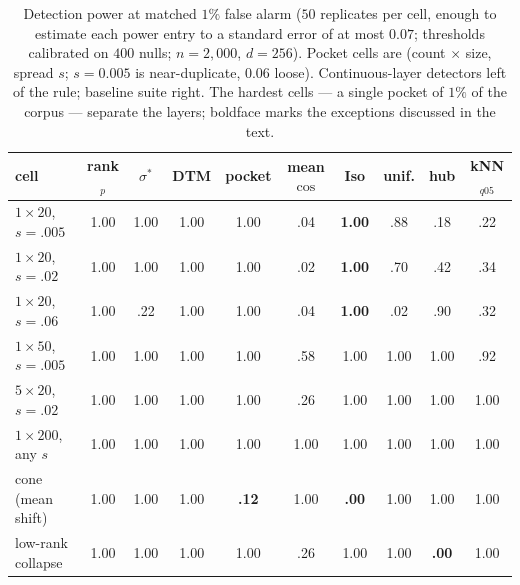 \documentclass[11pt,letterpaper]{article}
\newcommand{\sstar}{\sigma^{*}}
\begin{document}
\begin{table}[t]
\centering
\caption{Detection power at matched $1\%$ false alarm ($50$ replicates per cell,
enough to estimate each power entry to a standard error of at most $0.07$;
thresholds calibrated on $400$ nulls; $n = 2{,}000$, $d = 256$). Pocket
cells are (count $\times$ size, spread $s$; $s = 0.005$ is near-duplicate,
$0.06$ loose). Continuous-layer detectors left of the rule; baseline suite
right. The hardest cells --- a single pocket of $1\%$ of the corpus ---
separate the layers; boldface marks the exceptions discussed in the text.}
\label{tab:power}
\small
\setlength{\tabcolsep}{4.2pt}
\begin{tabular}{l cccc | ccccc}
\toprule
cell & rank$_p$ & $\sstar$ & DTM & pocket & mean$\cos$ & Iso & unif. & hub & kNN$_{q05}$\\
\midrule
$1{\times}20$, $s{=}.005$ & 1.00 & 1.00 & 1.00 & 1.00 & .04 & \textbf{1.00} & .88 & .18 & .22\\
$1{\times}20$, $s{=}.02$  & 1.00 & 1.00 & 1.00 & 1.00 & .02 & \textbf{1.00} & .70 & .42 & .34\\
$1{\times}20$, $s{=}.06$  & 1.00 & .22 & 1.00 & 1.00 & .04 & \textbf{1.00} & .02 & .90 & .32\\
$1{\times}50$, $s{=}.005$ & 1.00 & 1.00 & 1.00 & 1.00 & .58 & 1.00 & 1.00 & 1.00 & .92\\
$5{\times}20$, $s{=}.02$  & 1.00 & 1.00 & 1.00 & 1.00 & .26 & 1.00 & 1.00 & 1.00 & 1.00\\
$1{\times}200$, any $s$   & 1.00 & 1.00 & 1.00 & 1.00 & 1.00 & 1.00 & 1.00 & 1.00 & 1.00\\
cone (mean shift)         & 1.00 & 1.00 & 1.00 & \textbf{.12} & 1.00 & \textbf{.00} & 1.00 & 1.00 & 1.00\\
low-rank collapse         & 1.00 & 1.00 & 1.00 & 1.00 & .26 & 1.00 & 1.00 & \textbf{.00} & 1.00\\
\bottomrule
\end{tabular}
\end{table}
\end{document}
